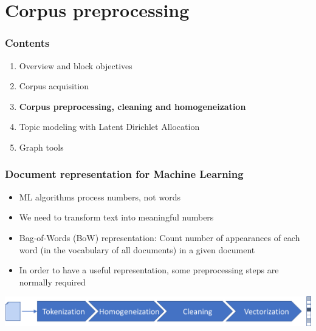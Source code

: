 \documentclass{beamer}
\begin{document}
\section{Corpus preprocessing}

\begin{frame}

    \frametitle{Contents}

	\large

    \begin{enumerate}
  
    	\item Overview and block objectives
    	\item Corpus acquisition
    	\item {\bf \color{blue}Corpus preprocessing, cleaning and homogeneization}
    	\item Topic modeling with Latent Dirichlet Allocation
    	\item Graph tools
    
    \end{enumerate}

\end{frame}


\begin{frame}

    \frametitle{Document representation for Machine Learning}

    \begin{itemize}
  
    	\item ML algorithms process numbers, not words
    	\item We need to transform text into meaningful numbers
    	\item Bag-of-Words (BoW) representation: Count number of appearances of each word (in the vocabulary of all documents) in a given document
    	\item In order to have a useful representation, some preprocessing steps are normally required
    
    \end{itemize}
    
    \vspace{1cm}
    
    \centerline{\includegraphics[width=\textwidth]{./figs/NLPTM_doc_preproc.png}}

\end{frame}
\end{document}
